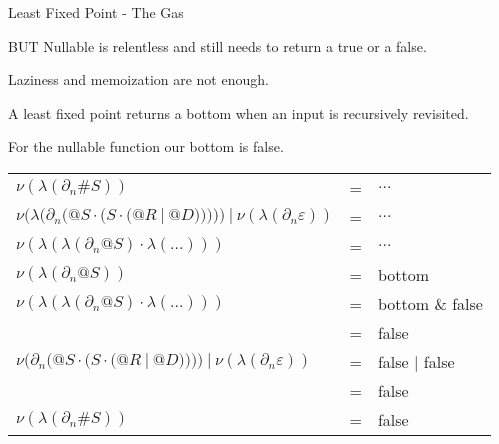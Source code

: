 \documentclass[10pt]{beamer}
\begin{document}
\begin{frame}{Least Fixed Point - The Gas}


BUT Nullable is relentless and still needs to return a true or a false.

Laziness and memoization are not enough.

A least fixed point returns a bottom when an input is recursively revisited.

For the nullable function our bottom is false.

\begin{center}
\begin{tabular}{lll}
$\nu(\lambda(\partial_n \#S))$ &=& $\ldots$\\
$\nu(\lambda(\partial_n(@S \cdot (S \cdot ( @R\ |\ @D )))))\ |\ \nu(\lambda(\partial_n \varepsilon))$ &=& $\ldots$ \\
$\nu(\lambda(\lambda(\partial_n @S) \cdot \lambda(\ldots)))$& = & $\ldots$ \\
$\nu(\lambda(\partial_n @S))$ &=& {\color{mLightGreen} bottom} \\
$\nu(\lambda(\lambda(\partial_n @S) \cdot \lambda(\ldots)))$& = & {\color{mLightGreen} bottom} \& false \\
&=& {\color{mLightGreen} false} \\
$\nu(\partial_n(@S \cdot (S \cdot ( @R\ |\ @D ))))\ |\ \nu(\lambda(\partial_n \varepsilon))$ &=& {\color{mLightGreen} false} | false\\
&=& {\color{mLightGreen} false} \\
$\nu(\lambda(\partial_n \#S))$ &=& {\color{mLightGreen} false} \\
\end{tabular}
\end{center}
\end{frame}
\end{document}
